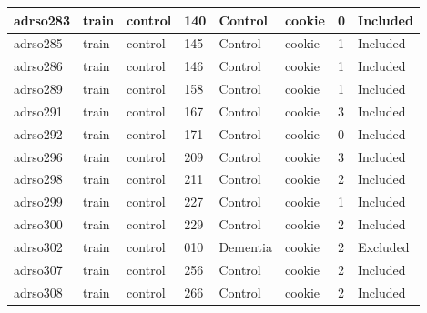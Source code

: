 \begin{center}
\begin{longtable}{|l|l|l|l|l|l|l|l|}
adrso283       & train                 & control           & 140                & Control              & cookie          & 0                & Included      \\ \hline
adrso285       & train                 & control           & 145                & Control              & cookie          & 1                & Included      \\ \hline
adrso286       & train                 & control           & 146                & Control              & cookie          & 1                & Included      \\ \hline
adrso289       & train                 & control           & 158                & Control              & cookie          & 1                & Included      \\ \hline
adrso291       & train                 & control           & 167                & Control              & cookie          & 3                & Included      \\ \hline
adrso292       & train                 & control           & 171                & Control              & cookie          & 0                & Included      \\ \hline
adrso296       & train                 & control           & 209                & Control              & cookie          & 3                & Included      \\ \hline
adrso298       & train                 & control           & 211                & Control              & cookie          & 2                & Included      \\ \hline
adrso299       & train                 & control           & 227                & Control              & cookie          & 1                & Included      \\ \hline
adrso300       & train                 & control           & 229                & Control              & cookie          & 2                & Included      \\ \hline
adrso302       & train                 & control           & 010                & Dementia             & cookie          & 2                & Excluded      \\ \hline
adrso307       & train                 & control           & 256                & Control              & cookie          & 2                & Included      \\ \hline
adrso308       & train                 & control           & 266                & Control              & cookie          & 2                & Included      \\ \hline

\end{longtable}
\end{center}

